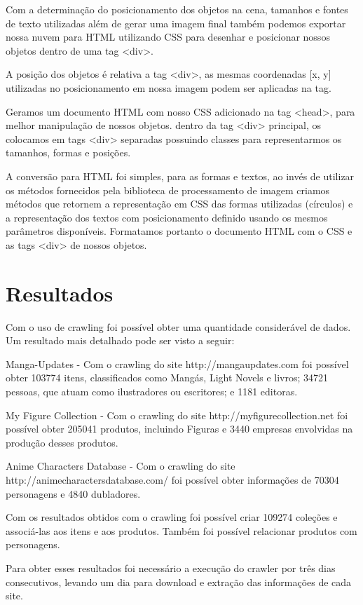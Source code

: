 \documentclass[12pt]{article}
\begin{document}
Com a determinação do posicionamento dos objetos na cena, tamanhos e fontes de texto utilizadas além de gerar uma imagem final também podemos exportar nossa nuvem para HTML utilizando CSS para desenhar e posicionar nossos objetos dentro de uma tag <div>.

A posição dos objetos é relativa a tag <div>, as mesmas coordenadas [x, y] utilizadas no posicionamento em nossa imagem podem ser aplicadas na tag.

Geramos um documento HTML com nosso CSS adicionado na tag <head>, para melhor manipulação de nossos objetos. dentro da tag <div> principal, os colocamos em tags <div> separadas possuindo classes para representarmos os tamanhos, formas e posições.

A conversão para HTML foi simples, para as formas e textos, ao invés de utilizar os métodos fornecidos pela biblioteca de processamento de imagem criamos métodos que retornem a representação em CSS das formas utilizadas (círculos) e a representação dos textos com posicionamento definido usando os mesmos parâmetros disponíveis. 
Formatamos portanto o documento HTML com o CSS e as tags <div> de nossos objetos.


\section{Resultados}

Com o uso de crawling foi possível obter uma quantidade considerável de dados. Um resultado mais detalhado pode ser visto a seguir: 

Manga-Updates - Com o crawling do site http://mangaupdates.com foi possível obter 103774 itens, classificados como Mangás, Light Novels e livros; 34721 pessoas, que atuam como ilustradores ou escritores; e 1181 editoras.

My Figure Collection - Com o crawling do site http://myfigurecollection.net foi possível obter 205041 produtos, incluindo Figuras e 3440 empresas envolvidas na produção desses produtos.

Anime Characters Database - Com o crawling do site http://animecharactersdatabase.com/ foi possível obter informações de 70304 personagens e 4840 dubladores.

Com os resultados obtidos com o crawling foi possível criar 109274 coleções e associá-las aos itens e aos produtos. Também foi possível relacionar produtos com personagens.

Para obter esses resultados foi necessário a execução do crawler por três dias consecutivos, levando um dia para download e extração das informações de cada site.  
\end{document}
